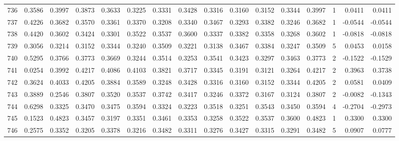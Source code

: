 \begin{tabular}{lrrrrrrrrrrrrrrr}
736 &      0.3586 &  0.3997 &  0.3873 &  0.3633 &  0.3225 &  0.3331 &  0.3428 &  0.3316 &  0.3160 &  0.3152 &   0.3344 &     0.3997 &      1 &                    0.0411 &                     0.0411 \\
737 &      0.4226 &  0.3682 &  0.3570 &  0.3361 &  0.3370 &  0.3208 &  0.3340 &  0.3467 &  0.3293 &  0.3382 &   0.3246 &     0.3682 &      1 &                   -0.0544 &                    -0.0544 \\
738 &      0.4420 &  0.3602 &  0.3424 &  0.3301 &  0.3522 &  0.3537 &  0.3600 &  0.3337 &  0.3382 &  0.3358 &   0.3268 &     0.3602 &      1 &                   -0.0818 &                    -0.0818 \\
739 &      0.3056 &  0.3214 &  0.3152 &  0.3344 &  0.3240 &  0.3509 &  0.3221 &  0.3138 &  0.3467 &  0.3384 &   0.3247 &     0.3509 &      5 &                    0.0453 &                     0.0158 \\
740 &      0.5295 &  0.3766 &  0.3773 &  0.3669 &  0.3244 &  0.3514 &  0.3253 &  0.3541 &  0.3423 &  0.3297 &   0.3463 &     0.3773 &      2 &                   -0.1522 &                    -0.1529 \\
741 &      0.0254 &  0.3992 &  0.4217 &  0.4086 &  0.4103 &  0.3821 &  0.3717 &  0.3345 &  0.3191 &  0.3121 &   0.3264 &     0.4217 &      2 &                    0.3963 &                     0.3738 \\
742 &      0.3624 &  0.4033 &  0.4205 &  0.3884 &  0.3589 &  0.3248 &  0.3428 &  0.3316 &  0.3160 &  0.3152 &   0.3344 &     0.4205 &      2 &                    0.0581 &                     0.0409 \\
743 &      0.3889 &  0.2546 &  0.3807 &  0.3520 &  0.3537 &  0.3742 &  0.3417 &  0.3246 &  0.3372 &  0.3167 &   0.3124 &     0.3807 &      2 &                   -0.0082 &                    -0.1343 \\
744 &      0.6298 &  0.3325 &  0.3470 &  0.3475 &  0.3594 &  0.3324 &  0.3223 &  0.3518 &  0.3251 &  0.3543 &   0.3450 &     0.3594 &      4 &                   -0.2704 &                    -0.2973 \\
745 &      0.1523 &  0.4823 &  0.3457 &  0.3197 &  0.3351 &  0.3461 &  0.3353 &  0.3258 &  0.3522 &  0.3537 &   0.3600 &     0.4823 &      1 &                    0.3300 &                     0.3300 \\
746 &      0.2575 &  0.3352 &  0.3205 &  0.3378 &  0.3216 &  0.3482 &  0.3311 &  0.3276 &  0.3427 &  0.3315 &   0.3291 &     0.3482 &      5 &                    0.0907 &                     0.0777 \\

\end{tabular}

